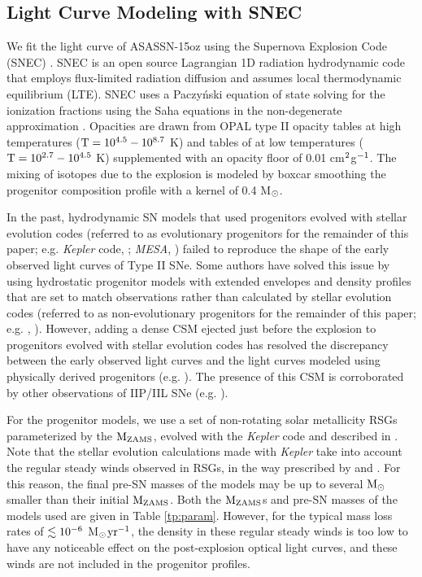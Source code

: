 \documentclass[a4paper,fleqn,usenatbib]{mnras}
\newcommand{\msunperiod}{M$\rm{_{\odot}}$}
\begin{document}
\subsection{Light Curve Modeling with SNEC}\label{sec:LCmodeling}
We fit the light curve of ASASSN-15oz using the Supernova Explosion Code (SNEC) \citep{2015morozova}.
SNEC is an open source Lagrangian 1D radiation hydrodynamic code that employs flux-limited radiation diffusion and assumes local thermodynamic equilibrium (LTE).
SNEC uses a Paczy\'nski equation of state \citep{1983paczynski} solving for the ionization fractions using the Saha equations in the non-degenerate approximation \citep{2000zaghloul}. 
Opacities are drawn from OPAL type II opacity tables \citep{1996iglesias} at high temperatures ($\rm{T=10^{4.5}-10^{8.7}}$ K) and tables of \citet{2005ferguson} at low temperatures ($\rm{T = 10^{2.7}-10^{4.5}}$ K) supplemented with an opacity floor of 0.01 cm$\rm{^2}$g$\rm{^{-1}}$. 
The mixing of isotopes due to the explosion is modeled by boxcar smoothing the progenitor composition profile with a kernel of 0.4 \msunperiod.

In the past, hydrodynamic SN models that used progenitors evolved with stellar evolution codes (referred to as evolutionary progenitors for the remainder of this paper; e.g. {\it Kepler} code, \citealt{1978weaver,2007woosley,2015woosley, 2014sukhbold,2016sukhbold}; {\it MESA}, \citealt{2018paxton}) failed to reproduce the shape of the early observed light curves of Type II SNe. 
Some authors have solved this issue by using hydrostatic progenitor models with extended envelopes and density profiles that are set to match observations rather than calculated by stellar evolution codes (referred to as non-evolutionary progenitors for the remainder of this paper; e.g. \citealt{2008utrobin}, \citealt{2017utrobin}). 
However, adding a dense CSM ejected just before the explosion to progenitors evolved with stellar evolution codes has resolved the discrepancy between the early observed light curves and the light curves modeled using physically derived progenitors (e.g. \citealt{2018morozova,2015gezari,2018foerster}).
The presence of this CSM is corroborated by other observations of IIP/IIL SNe (e.g. \citealt{2017yaron,2018bullivant}).

For the progenitor models, we use a set of non-rotating solar metallicity RSGs parameterized by the $\rm{M_{ZAMS}}$, evolved with the {\it Kepler} code and described in \citet{2016sukhbold}.
Note that the stellar evolution calculations made with {\it Kepler} take into account the regular steady winds observed in RSGs, in the way prescribed by \citet{1990nieuwenhuijzen} and \citet{1999wellstein}.
For this reason, the final pre-SN masses of the models may be up to several $\rm{M_{\odot}}$ smaller than their initial $\rm{M_{ZAMS}}$.
Both the $\rm{M_{ZAMS}}$s and pre-SN masses of the models used are given in Table \ref{tp:param}.
However, for the typical mass loss rates of $\rm{\lesssim10^{-6}}$ \msunperiod $\rm{yr^{-1}}$,  the density in these regular steady winds is too low to have any noticeable effect on the post-explosion optical light curves, and these winds are not included in the progenitor profiles. 
\end{document}
